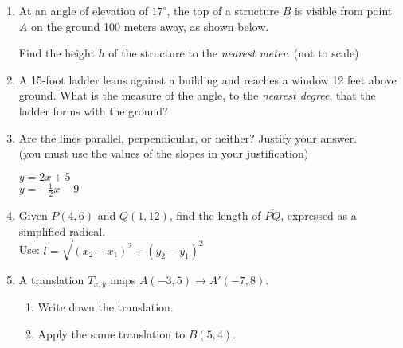\documentclass[12pt, twoside]{article}
\begin{document}
\begin{enumerate}
\item At an angle of elevation of $17^\circ$, the top of a structure $B$ is visible from point $A$ on the ground 100 meters away, as shown below.

Find the height $h$ of the structure to the \emph{nearest meter}. \hfill (not to scale)
  \begin{flushright}
    \end{flushright}

\item A 15-foot ladder leans against a building and reaches a window 12 feet above ground. What is the measure of the angle, to the \emph{nearest degree}, that the ladder forms with the ground?

\newpage
\item Are the lines parallel, perpendicular, or neither? Justify your answer. \\(you must use the values of the slopes in your justification)
  \begin{multicols}{2}
    $y = 2x+5$ \\
    $y = -\frac{1}{2}x-9$
  \end{multicols} \vspace{2cm}

\item Given $P(4,6)$ and $Q(1,12)$, find the length of $\overline{PQ}$, expressed as a simplified radical.\\[0.25cm]
Use: $l=\sqrt{(x_2-x_1)^2+(y_2-y_1)^2}$
    \vspace{6cm}

\item A translation $T_{x,y}$ maps $A(-3,5) \rightarrow A'(-7,8)$. 
\begin{enumerate}
  \item Write down the translation. \vspace{1cm}
  \item Apply the same translation to $B(5, 4)$.
\end{enumerate} \vspace{1.5cm}


\end{enumerate}
\end{document}
